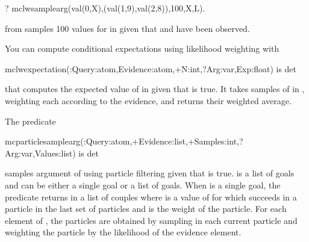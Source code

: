 \documentclass[letterpaper,10pt,english]{sphinxmanual}
\begin{document}
\begin{sphinxVerbatim}[commandchars=\\\{\}]
?\PYGZhy{} mc\PYGZus{}lw\PYGZus{}sample\PYGZus{}arg(val(0,X),(val(1,9),val(2,8)),100,X,L).
\end{sphinxVerbatim}

from  samples 100 values for  in  given that  and  have been observed.

You can compute conditional expectations using likelihood weighting with

\begin{sphinxVerbatim}[commandchars=\\\{\}]
mc\PYGZus{}lw\PYGZus{}expectation(:Query:atom,Evidence:atom,+N:int,?Arg:var,\PYGZhy{}Exp:float) is det
\end{sphinxVerbatim}

that computes the expected value of  in  given that  is true.
It takes  samples of  in , weighting each according to the evidence, and returns their weighted average.

The predicate

\begin{sphinxVerbatim}[commandchars=\\\{\}]
mc\PYGZus{}particle\PYGZus{}sample\PYGZus{}arg(:Query:atom,+Evidence:list,+Samples:int,?Arg:var,\PYGZhy{}Values:list) is det
\end{sphinxVerbatim}

samples argument  of  using particle filtering given that  is true.  is a list of goals and  can be either a single goal or a list of goals.
When  is a single goal, the predicate returns in  a list of couples  where  is a value of  for which  succeeds in a particle in the last set of particles and  is the weight of the particle.
For each element of , the particles are obtained by sampling  in each current particle and weighting the particle by the likelihood of the evidence element.
\end{document}
